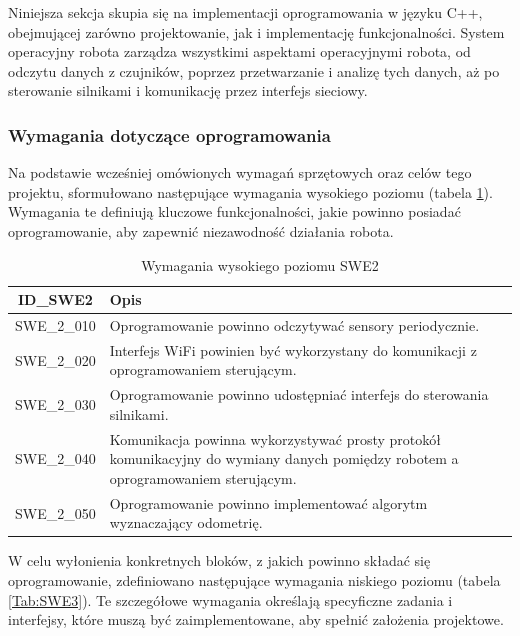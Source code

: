 \documentclass[12pt,twoside]{article}
\begin{document}
Niniejsza sekcja skupia się na implementacji oprogramowania w języku C++\cite{cpp}, obejmującej zarówno projektowanie, jak i implementację funkcjonalności. System operacyjny robota zarządza wszystkimi aspektami operacyjnymi robota, od odczytu danych z czujników, poprzez przetwarzanie i analizę tych danych, aż po sterowanie silnikami i komunikację  przez interfejs sieciowy.

\subsubsection{Wymagania dotyczące oprogramowania}

Na podstawie wcześniej omówionych wymagań sprzętowych oraz celów tego projektu, sformułowano następujące wymagania wysokiego poziomu (tabela \ref{Tab:SWE2}). Wymagania te definiują kluczowe funkcjonalności, jakie powinno posiadać oprogramowanie, aby zapewnić niezawodność działania robota.

\begin{table}[ht]
\caption{Wymagania wysokiego poziomu SWE2}
\centering		
	\begin{tabular}{|c|p{}|}	
		\hline
		ID\_SWE2 & Opis \\
		\hline
		SWE\_2\_010 & Oprogramowanie powinno odczytywać sensory periodycznie. \\
		\hline
		SWE\_2\_020 & Interfejs WiFi powinien być wykorzystany do komunikacji z oprogramowaniem sterującym. \\
		\hline 
		SWE\_2\_030 & Oprogramowanie powinno udostępniać interfejs do sterowania silnikami.\\
		\hline
		SWE\_2\_040 & Komunikacja powinna wykorzystywać prosty protokół komunikacyjny do wymiany danych pomiędzy robotem a oprogramowaniem sterującym. \\
		\hline
		SWE\_2\_050 & Oprogramowanie powinno implementować algorytm wyznaczający odometrię. \\
		\hline

	\end{tabular}	
	
\label{Tab:SWE2}
\end{table}	

W celu wyłonienia konkretnych bloków, z jakich powinno składać się oprogramowanie, zdefiniowano następujące wymagania niskiego poziomu (tabela \ref{Tab:SWE3}). Te szczegółowe wymagania określają specyficzne zadania i interfejsy, które muszą być zaimplementowane, aby spełnić założenia projektowe.
\end{document}
